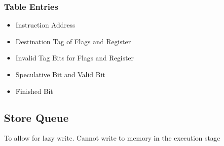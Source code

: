 \documentclass{article}
\begin{document}
\subsubsection{Table Entries}
\begin{itemize}
\item Instruction Address
\item Destination Tag of Flags and Register
\item Invalid Tag Bits for Flags and Register
\item Speculative Bit and Valid Bit
\item Finished Bit
\end{itemize}

\subsection{Store Queue}
To allow for lazy write. Cannot write to memory in the execution stage
\end{document}
